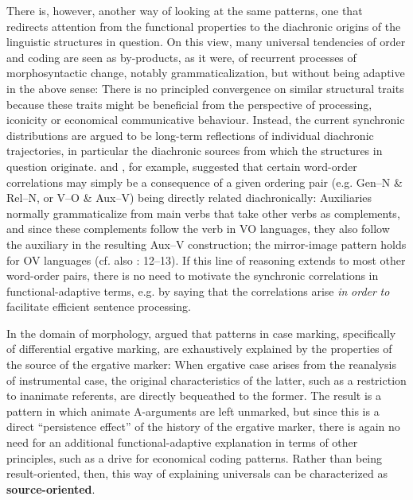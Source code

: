 \documentclass[output=paper]{langsci/langscibook}
\begin{document}
There is, however, another way of looking at the same patterns, one that redirects attention from the functional properties to the diachronic origins of the linguistic structures in question. On this view, many universal tendencies of order and coding are seen as by-products, as it were, of recurrent processes of morphosyntactic change, notably grammaticalization, but without being adaptive in the above sense: There is no principled convergence on similar structural traits because these traits might be beneficial from the perspective of processing, iconicity or economical communicative behaviour. Instead, the current synchronic distributions are argued to be long-term reflections of individual diachronic trajectories, in particular the diachronic sources from which the structures in question originate. \citet{Givón1984} and \citet{Aristar1991}, for example, suggested that certain word-order correlations may simply be a consequence of a given ordering pair (e.g. Gen–N \& Rel–N, or V–O \& Aux–V) being directly related diachronically: Auxiliaries normally grammaticalize from main verbs that take other verbs as complements, and since these complements follow the verb in VO languages, they also follow the auxiliary in the resulting Aux–V construction; the mirror-image pattern holds for OV languages (cf. also \citealt{Lehmann1986}: 12–13). If this line of reasoning extends to most other word-order pairs, there is no need to motivate the synchronic correlations in functional-adaptive terms, e.g. by saying that the correlations arise \textit{in} \textit{order} \textit{to} facilitate efficient sentence processing. 

In the domain of morphology, \citet{Garrett1990} argued that patterns in case marking, specifically of differential ergative marking, are exhaustively explained by the properties of the source of the ergative marker: When ergative case arises from the reanalysis of instrumental case, the original characteristics of the latter, such as a restriction to inanimate referents, are directly bequeathed to the former. The result is a pattern in which animate A-arguments are left unmarked, but since this is a direct “persistence effect” \citep{Hopper1991} of the history of the ergative marker, there is again no need for an additional functional-adaptive explanation in terms of other principles, such as a drive for economical coding patterns. Rather than being result-oriented, then, this way of explaining universals can be characterized as \textbf{source-oriented}.
\end{document}
